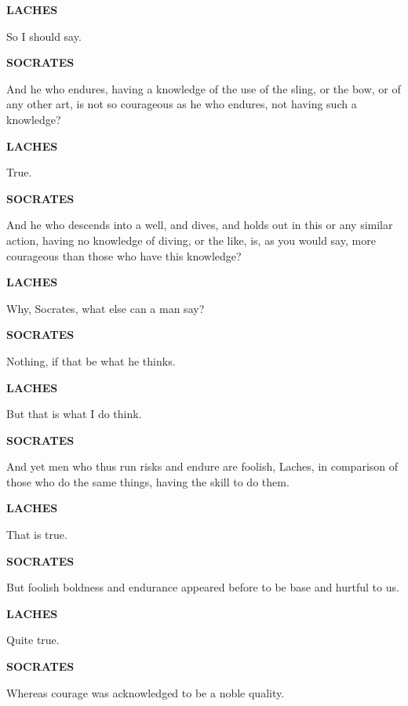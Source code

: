 \documentclass[11pt,letter]{article}
\begin{document}
\par \textbf{LACHES}
\par   So I should say.

\par \textbf{SOCRATES}
\par   And he who endures, having a knowledge of the use of the sling, or the bow, or of any other art, is not so courageous as he who endures, not having such a knowledge?

\par \textbf{LACHES}
\par   True.

\par \textbf{SOCRATES}
\par   And he who descends into a well, and dives, and holds out in this or any similar action, having no knowledge of diving, or the like, is, as you would say, more courageous than those who have this knowledge?

\par \textbf{LACHES}
\par   Why, Socrates, what else can a man say?

\par \textbf{SOCRATES}
\par   Nothing, if that be what he thinks.

\par \textbf{LACHES}
\par   But that is what I do think.

\par \textbf{SOCRATES}
\par   And yet men who thus run risks and endure are foolish, Laches, in comparison of those who do the same things, having the skill to do them.

\par \textbf{LACHES}
\par   That is true.

\par \textbf{SOCRATES}
\par   But foolish boldness and endurance appeared before to be base and hurtful to us.

\par \textbf{LACHES}
\par   Quite true.

\par \textbf{SOCRATES}
\par   Whereas courage was acknowledged to be a noble quality.
\end{document}
